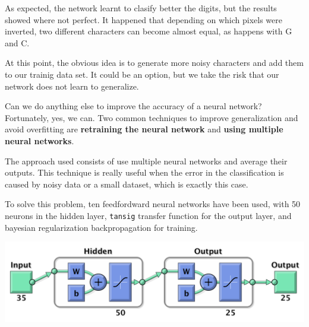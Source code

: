 \documentclass[10pt]{article}
\begin{document}
\begin{multicols}{2}
  As expected, the network learnt to clasify better the digits, but the results showed where
  not perfect. It happened that depending on which pixels were inverted, two different
  characters can become almost equal, as happens with G and C.

  At this point, the obvious idea is to generate more noisy characters and add them to our
  trainig data set. It could be an option, but we take the risk that our network does not
  learn to generalize.

  Can we do anything else to improve the accuracy of a neural network? Fortunately, yes, we can.
  Two common techniques to improve generalization and avoid overfitting are
  \textbf{retraining the neural network} and \textbf{using multiple neural networks}.

  The approach used consists of use multiple neural networks and average their outputs.
  This technique is really useful when the error in the classification is caused by noisy
  data or a small dataset, which is exactly this case.

  To solve this problem, ten feedfordward neural networks have been used, with
  50 neurons in the hidden layer, \texttt{tansig} transfer function for the output
  layer, and bayesian regularization backpropagation for training.

  \begin{center}
    \includegraphics[width=\linewidth]{img/net2}
  \end{center}
  

\end{multicols}
\end{document}
